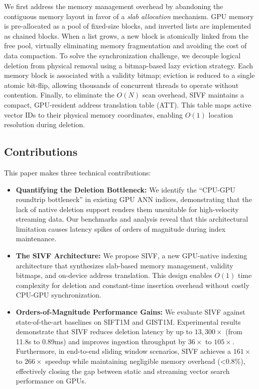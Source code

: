 \documentclass[sigconf,nonacm]{acmart}
\theoremstyle{plain}
\theoremstyle{definition}
\theoremstyle{remark}
\begin{document}
We first address the memory management overhead by abandoning the contiguous memory layout in favor of a \emph{slab allocation} mechanism. GPU memory is pre-allocated as a pool of fixed-size blocks, and inverted lists are implemented as chained blocks. When a list grows, a new block is atomically linked from the free pool, virtually eliminating memory fragmentation and avoiding the cost of data compaction. To solve the synchronization challenge, we decouple logical deletion from physical removal using a bitmap-based lazy eviction strategy. Each memory block is associated with a validity bitmap; eviction is reduced to a single atomic bit-flip, allowing thousands of concurrent threads to operate without contention. Finally, to eliminate the $O(N)$ scan overhead, SIVF maintains a compact, GPU-resident address translation table (ATT). This table maps active vector IDs to their physical memory coordinates, enabling $O(1)$ location resolution during deletion.

\subsection{Contributions}
\label{sec:contributions}

This paper makes three technical contributions:

\begin{itemize}
    \item \textbf{Quantifying the Deletion Bottleneck:} We identify the ``CPU-GPU roundtrip bottleneck'' in existing GPU ANN indices, demonstrating that the lack of native deletion support renders them unsuitable for high-velocity streaming data. Our benchmarks and analysis reveal that this architectural limitation causes latency spikes of orders of magnitude during index maintenance.
    
    \item \textbf{The SIVF Architecture:} We propose SIVF, a new GPU-native indexing architecture that synthesizes slab-based memory management, validity bitmaps, and on-device address translation. This design enables $O(1)$ time complexity for deletion and constant-time insertion overhead without costly CPU-GPU synchronization.
    
    \item \textbf{Orders-of-Magnitude Performance Gains:} We evaluate SIVF against state-of-the-art baselines on SIFT1M and GIST1M. Experimental results demonstrate that SIVF reduces deletion latency by up to $13,300\times$ (from 11.8s to 0.89ms) and improves ingestion throughput by $36\times$ to $105\times$. Furthermore, in end-to-end sliding window scenarios, SIVF achieves a $161\times$ to $266\times$ speedup while maintaining negligible memory overhead (<0.8\%), effectively closing the gap between static and streaming vector search performance on GPUs.
\end{itemize}
\end{document}
